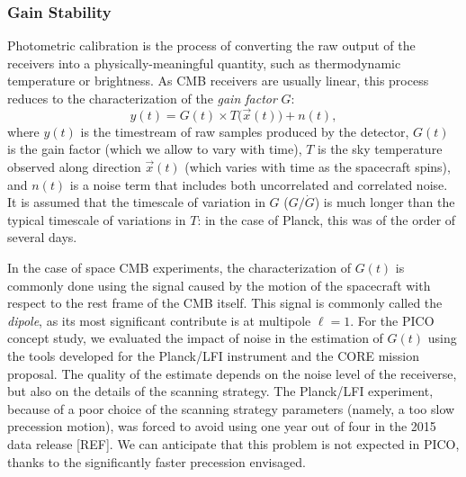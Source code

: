 \documentclass[PICOReport.tex]{subfiles}
\begin{document}
\subsubsection{Gain Stability}
\label{sec:gain}
Photometric calibration is the process of converting the raw output of the receivers into a physically-meaningful quantity, such as thermodynamic temperature or brightness. As CMB receivers are usually linear, this process reduces to the characterization of the \emph{gain factor} $G$:
\begin{equation}
\label{eq:gainStability:Response}
y(t) = G(t) \times T\bigl(\vec{x}(t)\bigr) + n(t),
\end{equation}
where $y(t)$ is the timestream of raw samples produced by the detector, $G(t)$ is the gain factor (which we allow to vary with time), $T$ is the sky temperature observed along direction $\vec{x}(t)$ (which varies with time as the spacecraft spins), and $n(t)$ is a noise term that includes both uncorrelated and correlated noise. It is assumed that the timescale of variation in $G$ ($G / \dot{G}$) is much longer than the typical timescale of variations in $T$: in the case of Planck, this was of the order of several days.

In the case of space CMB experiments, the characterization of $G(t)$ is commonly done using the signal caused by the motion of the spacecraft with respect to the rest frame of the CMB itself. This signal is commonly called the \emph{dipole}, as its most significant contribute is at multipole $\ell=1$. For the PICO concept study, we evaluated the impact of noise in the estimation of $G(t)$ using the tools developed for the Planck/LFI instrument and the CORE mission proposal. The quality of the estimate depends on the noise level of the receiverse, but also on the details of the scanning strategy. The Planck/LFI experiment, because of a poor choice of the scanning strategy parameters (namely, a too slow precession motion), was forced to avoid using one year out of four in the 2015 data release [REF]. We can anticipate that this problem is not expected in PICO, thanks to the significantly faster precession envisaged.
\end{document}

